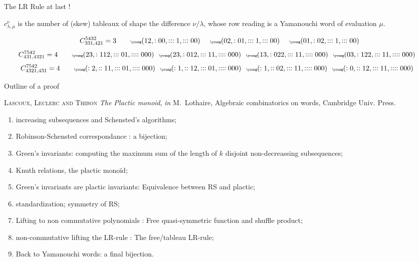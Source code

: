 \documentclass[compress,11pt]{beamer}
\begin{document}
\begin{frame}{The LR Rule at last !}

  \begin{THEO}
    $c_{\lambda, \mu}^{\nu}$ is the number of (skew) tableaux of shape the
    difference $\nu/\lambda$, whose row reading is a Yamanouchi word of
    evaluation $\mu$.
  \end{THEO}
  \[
  C_{331,421}^{5432} = 3
  \qquad \tiny
  \young(12,:00,:::1,:::00)\qquad
  \young(02,:01,:::1,:::00)\qquad
  \young(01,:02,:::1,:::00)
  \]
  \[
  C_{431,4321}^{7542} = 4
  \qquad \tiny
  \young(23,:112,:::01,::::000)\quad
  \young(23,:012,:::11,::::000)\quad
  \young(13,:022,:::11,::::000)\quad
  \young(03,:122,:::11,::::000)\quad
  \]
  \[
  C_{4321,431}^{7542} = 4
  \qquad \tiny
  \young(:2,::11,:::01,::::000)\quad
  \young(:1,::12,:::01,::::000)\quad
  \young(:1,::02,:::11,::::000)\quad
  \young(:0,::12,:::11,::::000)\quad
  \]

\end{frame}

\begin{frame}{Outline of a proof}

  \textsc{\sc Lascoux, Leclerc and Thibon} \textit{The Plactic monoid},
    {\it in} M.~Lothaire, Algebraic combinatorics on words,
    Cambridge Univ. Press.

  \begin{enumerate}
  \item increasing subsequences and Schensted's algorithms;
  \item Robinson-Schensted correspondance : a bijection;
  \item Green's invariants: computing the maximum sum of the length of $k$ disjoint
    non-decreassing subsequences;
  \item Knuth relations, the plactic monoïd;
  \item Green's invariants are plactic invariants: Equivalence between RS and plactic;
  \item standardization; symmetry of RS;
  \item Lifting to non commutative polynomials : Free quasi-symmetric function
    and shuffle product;
  \item non-commutative lifting the LR-rule : The free/tableau LR-rule;
  \item Back to Yamanouchi words: a final bijection.
  \end{enumerate}
\end{frame}
\end{document}
